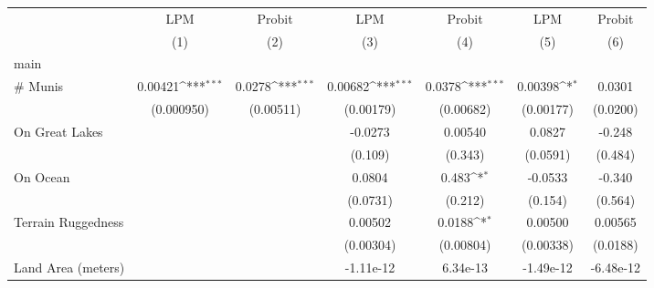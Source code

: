 {
\def\sym#1{\ifmmode^{#1}\else\(^{#1}\)\fi}
\begin{tabular}{l*{6}{c}}
\toprule
                    &\multicolumn{1}{c}{LPM}&\multicolumn{1}{c}{Probit}&\multicolumn{1}{c}{LPM}&\multicolumn{1}{c}{Probit}&\multicolumn{1}{c}{LPM}&\multicolumn{1}{c}{Probit}\\
                    &\multicolumn{1}{c}{(1)}         &\multicolumn{1}{c}{(2)}         &\multicolumn{1}{c}{(3)}         &\multicolumn{1}{c}{(4)}         &\multicolumn{1}{c}{(5)}         &\multicolumn{1}{c}{(6)}         \\
\midrule
main                &                     &                     &                     &                     &                     &                     \\
\# Munis            &     0.00421\sym{***}&      0.0278\sym{***}&     0.00682\sym{***}&      0.0378\sym{***}&     0.00398\sym{*}  &      0.0301         \\
                    &  (0.000950)         &   (0.00511)         &   (0.00179)         &   (0.00682)         &   (0.00177)         &    (0.0200)         \\
\addlinespace
On Great Lakes      &                     &                     &     -0.0273         &     0.00540         &      0.0827         &      -0.248         \\
                    &                     &                     &     (0.109)         &     (0.343)         &    (0.0591)         &     (0.484)         \\
\addlinespace
On Ocean            &                     &                     &      0.0804         &       0.483\sym{*}  &     -0.0533         &      -0.340         \\
                    &                     &                     &    (0.0731)         &     (0.212)         &     (0.154)         &     (0.564)         \\
\addlinespace
Terrain Ruggedness  &                     &                     &     0.00502         &      0.0188\sym{*}  &     0.00500         &     0.00565         \\
                    &                     &                     &   (0.00304)         &   (0.00804)         &   (0.00338)         &    (0.0188)         \\
\addlinespace
Land Area (meters)  &                     &                     &   -1.11e-12         &    6.34e-13         &   -1.49e-12         &   -6.48e-12         \\

\end{tabular}}
